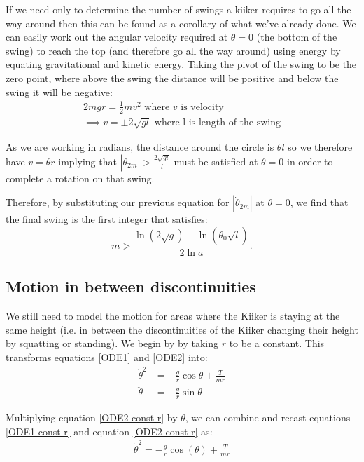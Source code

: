 \documentclass[12pt]{article}
\begin{document}
If we need only to determine the number of swings a kiiker requires to go all the way around then this can be found as a corollary of what we've already done. We can easily work out the angular velocity required at $\theta = 0$ (the bottom of the swing) to reach the top (and therefore go all the way around) using energy by equating gravitational and kinetic energy. Taking the pivot of the swing to be the zero point, where above the swing the distance will be positive and below the swing it will be negative:
\begin{align}
    2mgr = \frac{1}{2}mv^2 \,\, \text{where $v$ is velocity }\\
    \implies v = \pm 2\sqrt{gl} \,\, \text{where l is length of the swing}
\end{align}

As we are working in radians, the distance around the circle is $\theta l$ so we therefore have $v = \dot{\theta}r$ implying that $|{\dot{\theta}_{2m}}| >  \frac{2\sqrt{gl}}{l}$ must be satisfied at $\theta = 0$ in order to complete a rotation on that swing.

Therefore, by substituting our previous equation for $|{\dot{\theta}_{2m}}|$ at $\theta = 0$, we find that the final swing is the first integer that satisfies:
\begin{equation}
    m >\frac{\ln\left({2 \sqrt{g}}\right) - \ln{\left(\dot{\theta}_0 \sqrt{l}\right)}}{2\ln{a}}.
\end{equation}

\subsection{Motion in between discontinuities}
We still need to model the motion for areas where the Kiiker is staying at the same height (i.e. in between the discontinuities of the Kiiker changing their height by squatting or standing). We begin by by taking $r$ to be a constant. This transforms equations \ref{ODE1} and \ref{ODE2} into:
\begin{align}
    \dot{\theta}^2 &= -\frac{g}{r} \cos{\theta} + \frac{T}{mr} \label{ODE1 const r}
    \\\ddot{\theta} &= -\frac{g}{r}\sin{\theta} \label{ODE2 const r}
\end{align}

Multiplying equation \ref{ODE2 const r} by $\dot{\theta}$, we can combine and recast equations \ref{ODE1 const r} and equation \ref{ODE2 const r} as:
\begin{align}
    \dot{\theta}^2 = -\frac{g}{r}\cos(\theta) + \frac{T}{mr}
\end{align}
\end{document}
